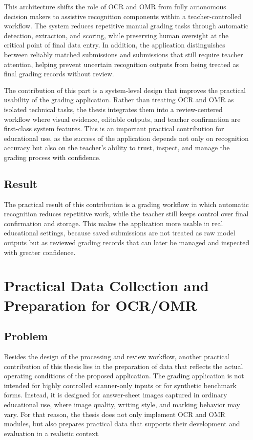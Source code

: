 \documentclass[../Main.tex]{subfiles}
\begin{document}
This architecture shifts the role of OCR and OMR from fully autonomous decision makers to assistive recognition components within a teacher-controlled workflow. The system reduces repetitive manual grading tasks through automatic detection, extraction, and scoring, while preserving human oversight at the critical point of final data entry. In addition, the application distinguishes between reliably matched submissions and submissions that still require teacher attention, helping prevent uncertain recognition outputs from being treated as final grading records without review.

The contribution of this part is a system-level design that improves the practical usability of the grading application. Rather than treating OCR and OMR as isolated technical tasks, the thesis integrates them into a review-centered workflow where visual evidence, editable outputs, and teacher confirmation are first-class system features. This is an important practical contribution for educational use, as the success of the application depends not only on recognition accuracy but also on the teacher's ability to trust, inspect, and manage the grading process with confidence.

\subsection{Result}
\label{subsection:5.3.3}

The practical result of this contribution is a grading workflow in which
automatic recognition reduces repetitive work, while the teacher still keeps
control over final confirmation and storage. This makes the application more
usable in real educational settings, because saved submissions are not treated
as raw model outputs but as reviewed grading records that can later be managed
and inspected with greater confidence.

\section{Practical Data Collection and Preparation for OCR/OMR}
\label{section:5.4}

\subsection{Problem}
\label{subsection:5.4.1}

Besides the design of the processing and review workflow, another practical
contribution of this thesis lies in the preparation of data that reflects the
actual operating conditions of the proposed application. The grading
application is not intended for highly controlled scanner-only inputs or for
synthetic benchmark forms. Instead, it is designed for answer-sheet images
captured in ordinary educational use, where image quality, writing style, and
marking behavior may vary. For that reason, the thesis does not only implement
OCR and OMR modules, but also prepares practical data that supports their
development and evaluation in a realistic context.
\end{document}
